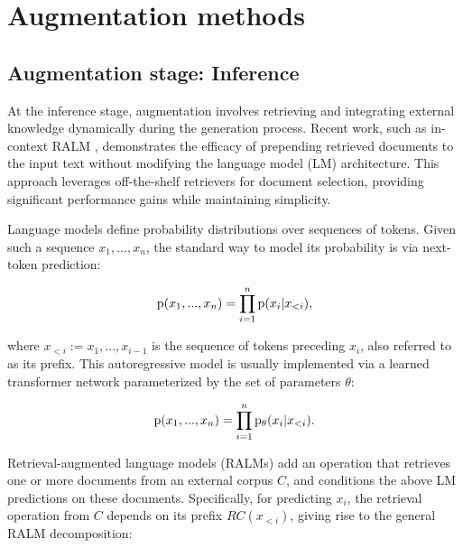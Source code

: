 


\section{Augmentation methods}

\subsection{Augmentation stage: Inference}

At the inference stage, augmentation involves retrieving and integrating external knowledge dynamically during the generation process. Recent work, such as in-context RALM \cite{ram2023incontext}, demonstrates the efficacy of prepending retrieved documents to the input text without modifying the language model (LM) architecture. This approach leverages off-the-shelf retrievers for document selection, providing significant performance gains while maintaining simplicity.

Language models define probability distributions over sequences of tokens. Given such a sequence \(x_1, ..., x_n\), the standard way to model its probability is via next-token prediction:

\[
{\rm{p}}(x_1, ..., x_n) = \prod_{i=1}^{n} {\rm{p}}(x_i | x_{<i}),
\]

where \(x_{<i} := x_1, ..., x_{i-1}\) is the sequence of tokens preceding \(x_i\), also referred to as its prefix. This autoregressive model is usually implemented via a learned transformer network \cite{vaswani2017} parameterized by the set of parameters \(\theta\):

\[
{\rm{p}}(x_1, ..., x_n) = \prod_{i=1}^{n} {\rm{p}}_{\theta}(x_i | x_{<i}).
\]

Retrieval-augmented language models (RALMs) add an operation that retrieves one or more documents from an external corpus \(C\), and conditions the above LM predictions on these documents. Specifically, for predicting \(x_i\), the retrieval operation from \(C\) depends on its prefix \({RC(x_{<i})}\), giving rise to the general RALM decomposition:

